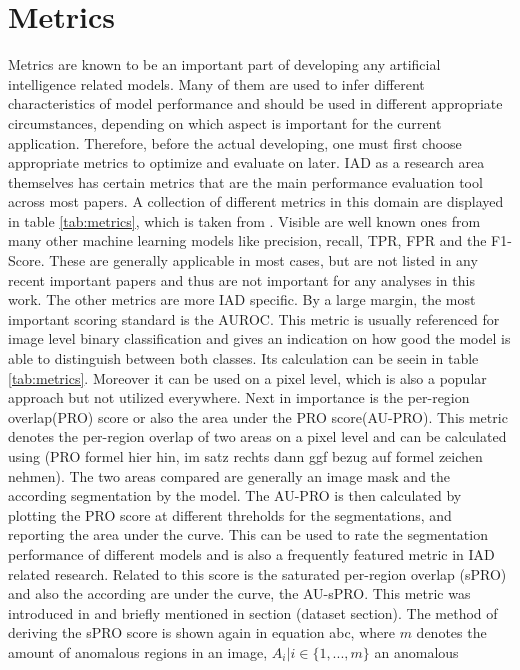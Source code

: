 \section{Metrics}
\label{sec:metrics}
Metrics are known to be an important part of developing any artificial intelligence related models. Many of them are used to infer 
different characteristics of model performance and should be used in different appropriate circumstances, depending on which aspect 
is important for the current application. Therefore, before the actual developing, one must first choose appropriate metrics 
to optimize and evaluate on later. IAD as a research area themselves has certain metrics that are the main performance evaluation tool 
across most papers. 
A collection of different metrics in this domain are displayed in table \ref{tab:metrics}, which is taken from 
\cite{liu2024deep}. Visible are well known 
ones from many other machine learning models like precision, recall, TPR, FPR and the F1-Score. These are generally applicable in most 
cases, but are not listed in any recent important papers and thus are not important for any analyses in this work. The other metrics are 
more IAD specific. By a large margin, the most important scoring standard is the AUROC. This metric is usually referenced for image level 
binary classification and gives an indication on how good the model is able to distinguish between both classes. Its calculation can be seein in 
table \ref{tab:metrics}. Moreover it can be used on a pixel level, which is also a popular approach but not utilized everywhere.
Next in importance is the per-region overlap(PRO) score or also the area under the PRO score(AU-PRO). This metric denotes the per-region overlap of two areas 
on a pixel level and can be calculated using (PRO formel hier hin, im satz rechts dann ggf bezug auf formel zeichen nehmen). The two areas 
compared are generally an image mask and the according segmentation by the model. The AU-PRO is then calculated by plotting the PRO score 
at different threholds for the segmentations, and reporting the area under the curve. This can be 
used to rate the segmentation performance of different models and is also a frequently featured metric in IAD related research. 
Related to this score is the saturated per-region overlap (sPRO) and also the according are under the curve, the AU-sPRO. This metric was 
introduced in \cite{LOCODentsAndScratchesBergmann2022} and briefly mentioned in section (dataset section). The method of deriving the sPRO 
score is shown again in equation abc, where $m$ denotes the amount of anomalous regions in an image, $A_i | i \in \{1, ... , m\}$ an anomalous 
